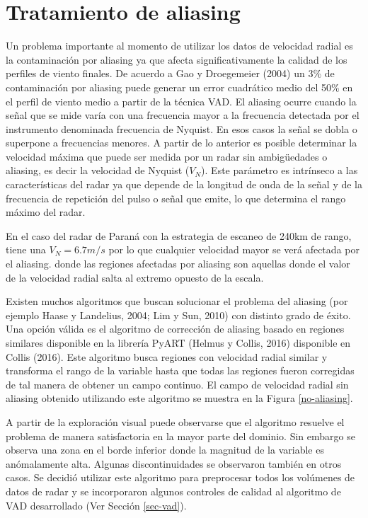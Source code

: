 \documentclass[12pt,spanish,oneside, a4paper]{book}
\begin{document}
\section{Tratamiento de aliasing}\label{tratamiento-de-aliasing}

Un problema importante al momento de utilizar los datos de velocidad
radial es la contaminación por aliasing ya que afecta significativamente
la calidad de los perfiles de viento finales. De acuerdo a Gao y
Droegemeier (2004) un 3\% de contaminación por aliasing puede generar un
error cuadrático medio del 50\% en el perfil de viento medio a partir de
la técnica VAD. El aliasing ocurre cuando la señal que se mide varía con
una frecuencia mayor a la frecuencia detectada por el instrumento
denominada frecuencia de Nyquist. En esos casos la señal se dobla o
superpone a frecuencias menores. A partir de lo anterior es posible
determinar la velocidad máxima que puede ser medida por un radar sin
ambigüedades o aliasing, es decir la velocidad de Nyquist (\(V_N\)).
Este parámetro es intrínseco a las características del radar ya que
depende de la longitud de onda de la señal y de la frecuencia de
repetición del pulso o señal que emite, lo que determina el rango máximo
del radar.

En el caso del radar de Paraná con la estrategia de escaneo de 240km de
rango, tiene una \(V_N = 6.7 m/s\) por lo que cualquier velocidad mayor
se verá afectada por el aliasing. donde las regiones afectadas por
aliasing son aquellas donde el valor de la velocidad radial salta al
extremo opuesto de la escala.

Existen muchos algoritmos que buscan solucionar el problema del aliasing
(por ejemplo Haase y Landelius, 2004; Lim y Sun, 2010) con distinto
grado de éxito. Una opción válida es el algoritmo de corrección de
aliasing basado en regiones similares disponible en la librería PyART
(Helmus y Collis, 2016) disponible en Collis (2016). Este algoritmo
busca regiones con velocidad radial similar y transforma el rango de la
variable hasta que todas las regiones fueron corregidas de tal manera de
obtener un campo continuo. El campo de velocidad radial sin aliasing
obtenido utilizando este algoritmo se muestra en la Figura
\ref{no-aliasing}.

A partir de la exploración visual puede observarse que el algoritmo
resuelve el problema de manera satisfactoria en la mayor parte del
dominio. Sin embargo se observa una zona en el borde inferior donde la
magnitud de la variable es anómalamente alta. Algunas discontinuidades
se observaron también en otros casos. Se decidió utilizar este algoritmo
para preprocesar todos los volúmenes de datos de radar y se incorporaron
algunos controles de calidad al algoritmo de VAD desarrollado (Ver
Sección \ref{sec-vad}).
\end{document}

